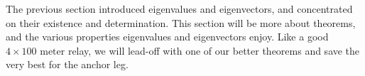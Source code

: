 %
\begin{introduction}
\begin{para}The previous section introduced eigenvalues and eigenvectors, and concentrated on their existence and determination.  This section will be more about theorems, and the various properties eigenvalues and eigenvectors enjoy.  Like a good $4\times 100\text{ meter}$ relay, we will lead-off with one of our better theorems and save the very best for the anchor leg.\end{para}
\end{introduction}
%
